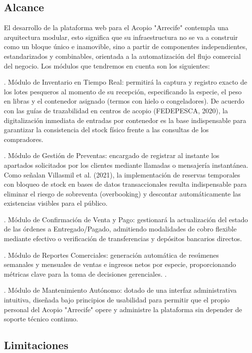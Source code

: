 \subsection{Alcance}

El desarrollo de la plataforma web para el Acopio "Arrecife" contempla una arquitectura modular, esto significa que su infraestructura no se va a construir como un bloque único e inamovible, sino a partir de componentes independientes, estandarizados y combinables, orientada a la automatización del flujo comercial del negocio. Los módulos que tendremos en cuenta son los siguientes: 

. Módulo de Inventario en Tiempo Real: permitirá la captura y registro exacto de los lotes pesqueros al momento de su recepción, especificando la especie, el peso en libras y el contenedor asignado (termos con hielo o congeladores). De acuerdo con las guías de trazabilidad en centros de acopio (FEDEPESCA, 2020), la digitalización inmediata de entradas por contenedor es la base indispensable para garantizar la consistencia del stock físico frente a las consultas de los compradores. 

. Módulo de Gestión de Preventas: encargado de registrar al instante los apartados solicitados por los clientes mediante llamadas o mensajería instantánea. Como señalan Villasmil et al. (2021), la implementación de reservas temporales con bloqueo de stock en bases de datos transaccionales resulta indispensable para eliminar el riesgo de sobreventa (overbooking) y descontar automáticamente las existencias visibles para el público. 

. Módulo de Confirmación de Venta y Pago: gestionará la actualización del estado de las órdenes a Entregado/Pagado, admitiendo modalidades de cobro flexible mediante efectivo o verificación de transferencias y depósitos bancarios directos. 

. Módulo de Reportes Comerciales: generación automática de resúmenes semanales y mensuales de ventas e ingresos netos por especie, proporcionando métricas clave para la toma de decisiones gerenciales. \textcite{Laudon, Kenneth C and Laudon.2012}.

. Módulo de Mantenimiento Autónomo: dotado de una interfaz administrativa intuitiva, diseñada bajo principios de usabilidad para permitir que el propio personal del Acopio "Arrecife" opere y administre la plataforma sin depender de soporte técnico continuo.


\subsection{Limitaciones}

